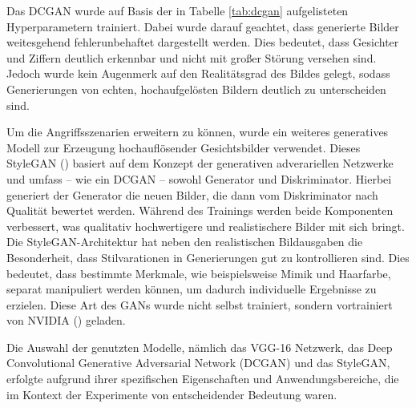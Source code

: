 \begin{table}[h]
	\centering
	\renewcommand{\arraystretch}{1.5}
	\caption{Hyperparameter eines DCGAN-Trainings bezüglich der angegebenen Datensätze}
	\label{tab:dcgan}
\end{table}

Das DCGAN wurde auf Basis der in Tabelle \ref{tab:dcgan} aufgelisteten Hyperparametern trainiert. Dabei wurde darauf geachtet, dass generierte Bilder \glqq weitesgehend fehlerunbehaftet\grqq{} dargestellt werden. Dies bedeutet, dass Gesichter und Ziffern deutlich erkennbar und nicht mit großer Störung versehen sind. Jedoch wurde kein Augenmerk auf den Realitätsgrad des Bildes gelegt, sodass Generierungen von echten, hochaufgelösten Bildern deutlich zu unterscheiden sind. 

Um die Angriffsszenarien erweitern zu können, wurde ein weiteres generatives Modell zur Erzeugung hochauflösender Gesichtsbilder verwendet. Dieses StyleGAN (\cite{karras_style-based_2019}) basiert auf dem Konzept der generativen adverariellen Netzwerke und umfass -- wie ein DCGAN -- sowohl Generator und Diskriminator. Hierbei generiert der Generator die neuen Bilder, die dann vom Diskriminator nach Qualität bewertet werden. Während des Trainings werden beide Komponenten verbessert, was qualitativ hochwertigere und realistischere Bilder mit sich bringt. Die StyleGAN-Architektur hat neben den realistischen Bildausgaben die Besonderheit, dass Stilvarationen in Generierungen gut zu kontrollieren sind. Dies bedeutet, dass bestimmte Merkmale, wie beispielsweise Mimik und Haarfarbe, separat manipuliert werden können, um dadurch individuelle Ergebnisse zu erzielen. Diese Art des GANs wurde nicht selbst trainiert, sondern vortrainiert von NVIDIA (\cite{noauthor_nvlabsstylegan_2024}) geladen.

Die Auswahl der genutzten Modelle, nämlich das VGG-16 Netzwerk, das Deep Convolutional Generative Adversarial Network (DCGAN) und das StyleGAN, erfolgte aufgrund ihrer spezifischen Eigenschaften und Anwendungsbereiche, die im Kontext der Experimente von entscheidender Bedeutung waren.

